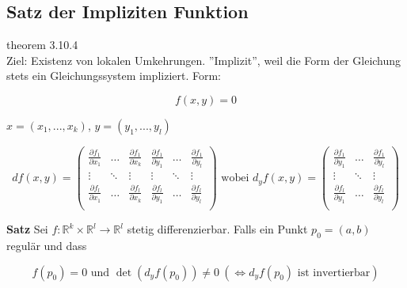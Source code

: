 
\subsection{Satz der Impliziten Funktion}

theorem 3.10.4\\

Ziel: Existenz von lokalen Umkehrungen. ''Implizit'', weil die Form der Gleichung stets ein Gleichungssystem impliziert. Form:

\[
    f(x, y) = 0
\]

$x = (x_1, ..., x_k)$, $y = (y_1, ..., y_l)$

\begin{tiny}
\[
    df(x, y) =
        \begin{pmatrix}
            \frac{\partial f_1}{\partial x_1} & \hdots & \frac{\partial f_1}{\partial x_k}
            & \frac{\partial f_1}{\partial y_1} & \hdots & \frac{\partial f_1}{\partial y_l}\\
            
            \vdots & \ddots & \vdots & \vdots & \ddots & \vdots\\
            
            \frac{\partial f_l}{\partial x_1} & \hdots & \frac{\partial f_l}{\partial x_k}
            & \frac{\partial f_l}{\partial y_1} & \hdots & \frac{\partial f_l}{\partial y_l}\\
        \end{pmatrix} \text{ wobei }
    d_yf(x, y) =
        \begin{pmatrix}
            \frac{\partial f_1}{\partial y_1} & \hdots & \frac{\partial f_1}{\partial y_l}\\
            
            \vdots & \ddots & \vdots\\
            
            \frac{\partial f_l}{\partial y_1} & \hdots & \frac{\partial f_l}{\partial y_l}\\
        \end{pmatrix}
\]
\end{tiny}

\textbf{Satz} Sei $f: \mathbb{R}^k \times \mathbb{R}^l \to \mathbb{R}^l$ stetig differenzierbar. Falls ein Punkt $p_0 = (a, b)$ regulär und dass

\[
    f(p_0) = 0 \text{ und } \det(d_y f(p_0)) \neq 0\ (\iff d_y f(p_0) \text{ ist invertierbar})
\]

